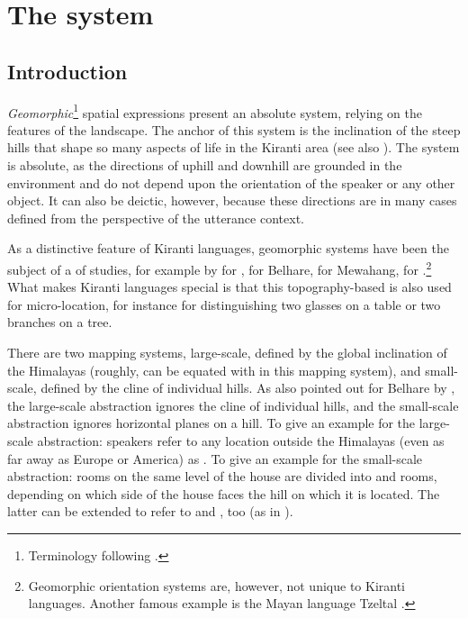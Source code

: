 \chapter{The  system}\label{ch-geomorphic}

\section{Introduction}

\emph{Geomorphic}\footnote{Terminology following \citet{Bickel1997Spatial}.} spatial expressions present an absolute system, relying on the features of the landscape. The anchor of this system is the inclination of the steep hills that shape so many aspects of life in the Kiranti area (see also ). The system is absolute, as the directions of uphill and downhill are grounded in the environment and do not depend upon the orientation of the speaker or any other object. It can also be deictic, however, because these directions are in many cases defined from the perspective of the utterance context. 

As a distinctive  feature of Kiranti languages, geomorphic systems have been the subject of a  of studies, for example by \citet{Allen1972The-vertical} for , \citet{Bickel1994Mapping, Bickel1999Cultural, Bickel1997Spatial, Bickel2001Deictic} for Belhare, \citet{Gaenszle1999Travelling} for Mewahang, \citet{Dirksmeyer2008Spatial} for .\footnote{Geomorphic orientation systems are, however, not unique to Kiranti languages. Another famous example is the Mayan language Tzeltal \citep{Brownetal1993Uphill}.} What makes Kiranti languages special is that this topography-based  is also used for micro-location, for instance for distinguishing two glasses on a table or two branches on a tree. 

There are two mapping systems, large-scale, defined by the global inclination of the Himalayas (roughly,  can be equated with  in this mapping system), and small-scale, defined by the cline of individual hills. As also pointed out for Belhare by \citet[55]{Bickel1997Spatial}, the large-scale abstraction ignores the cline of individual hills, and the small-scale abstraction ignores horizontal planes on a hill. To give an example for the large-scale abstraction: speakers refer to any location outside the Himalayas (even as far away as Europe or America) as . To give an example for the small-scale abstraction: rooms on the same level of the house are divided into  and  rooms, depending on which side of the house faces the hill on which it is located. The latter can be extended to refer to  and , too (as in ). 


